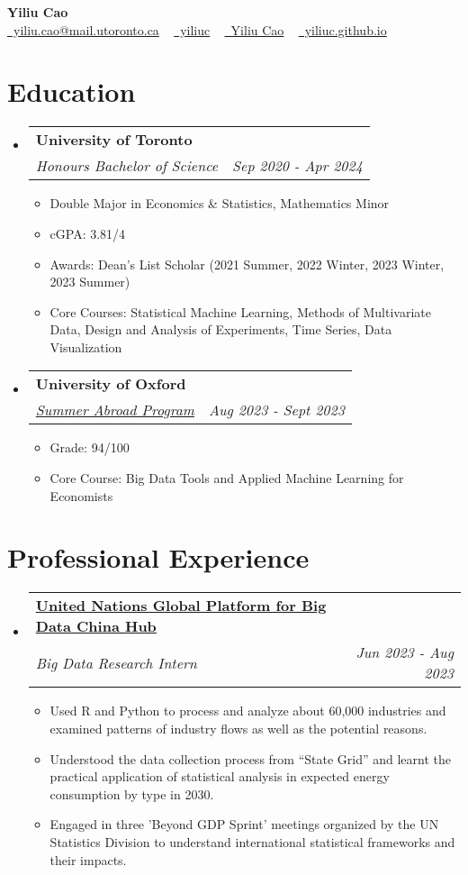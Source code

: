 \documentclass[letterpaper]{article}
\makeatletter
\newcommand{\resumeItem}[1]{
  \renewcommand{\labelitemi}{-} %
  \item{\fontsize{12}{12}\selectfont
    {#1 \vspace{-1.5pt}}
  }
}
\newcommand{\resumeSubheading}[4]{
  \vspace{-3pt}\item
    \begin{tabular*}{1.0\textwidth}[t]{l@{\extracolsep{\fill}}r}
      {\fontsize{12}{12}\selectfont\textbf{#1}} & {\fontsize{12}{12}\selectfont{#2}} \\
      {\fontsize{12}{12}\selectfont\textit{#3}} & {\fontsize{12}{12}\selectfont\textit{#4}} \\
    \end{tabular*}\vspace{-7pt}
}
\newcommand{\resumeSubHeadingListStart}{\begin{itemize}[leftmargin=0.0in, label={}]}
\newcommand{\resumeSubHeadingListEnd}{\end{itemize}}
\newcommand{\resumeItemListStart}{\begin{itemize}}
\newcommand{\resumeItemListEnd}{\end{itemize}\vspace{-5pt}}
\makeatother
\begin{document}
\begin{center}
  {\Huge \textbf{Yiliu Cao}} \\ \vspace{5pt}
  \href{mailto:yiliu.cao@mail.utoronto.ca}{\raisebox{-0.0\height}\faEnvelope\ yiliu.cao@mail.utoronto.ca} ~
  \href{https://github.com/yiliuc}{\raisebox{-0.0\height}\faGithub\ yiliuc} ~
  \href{https://www.linkedin.com/in/yiliu-cao-842333270/}{\raisebox{-0.0\height}\faLinkedin\ Yiliu Cao}  ~
  \href{https://yiliuc.github.io}{\raisebox{-0.0\height}\faGlobe\ yiliuc.github.io}
  \vspace{-8pt}
\end{center}


\vspace{-10pt}
\section{Education}
\resumeSubHeadingListStart
\resumeSubheading
{University of Toronto}{Toronto, ON}{Honours Bachelor of Science}{Sep 2020 - Apr 2024}
\resumeItemListStart
\resumeItem{Double Major in Economics \& Statistics, Mathematics Minor}
\resumeItem{cGPA: 3.81/4}
\resumeItem{Awards: Dean’s List Scholar (2021 Summer, 2022 Winter, 2023 Winter, 2023 Summer)}
\resumeItem{Core Courses: Statistical Machine Learning, Methods of Multivariate Data, Design and Analysis of Experiments, Time Series, Data Visualization}
\resumeItemListEnd
\resumeSubHeadingListEnd

\resumeSubHeadingListStart
\resumeSubheading
{University of Oxford}{Oxford, UK}{\href{https://summerabroad.utoronto.ca/program/england-oxford/courses}{Summer Abroad Program}}{Aug 2023 - Sept 2023}
\resumeItemListStart
\resumeItem{Grade: 94/100}
\resumeItem{Core Course: Big Data Tools and Applied Machine Learning for Economists}
\resumeItemListEnd
\resumeSubHeadingListEnd
\vspace{-5pt}



\section{Professional Experience}
\resumeSubHeadingListStart
\resumeSubheading
{\href{https://unbdc.stats.gov.cn/en/}{United Nations Global Platform for Big Data China Hub}}{Hangzhou, China}{Big Data Research Intern}{Jun 2023 - Aug 2023}
\resumeItemListStart
\resumeItem{Used R and Python to process and analyze about 60,000 industries and examined patterns of industry flows as well as the potential reasons.}
\resumeItem{Understood the data collection process from “State Grid” and learnt the practical application of statistical analysis in expected energy consumption by type in 2030.}
\resumeItem{Engaged in three 'Beyond GDP Sprint' meetings organized by the UN Statistics Division to understand international statistical frameworks and their impacts.}
\resumeItemListEnd
\resumeSubHeadingListEnd
\end{document}
